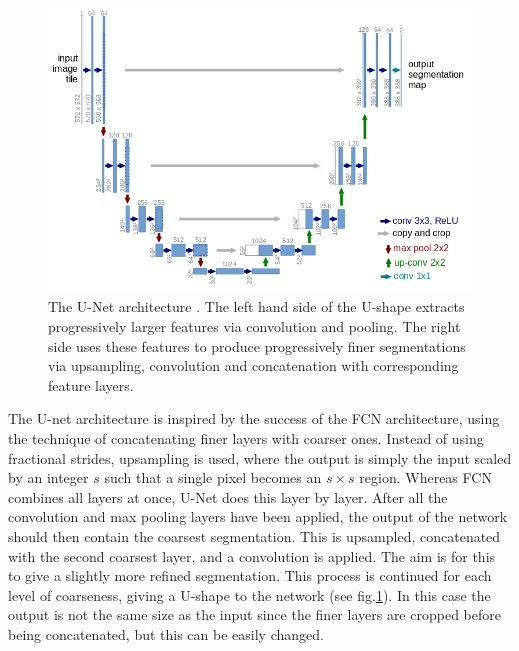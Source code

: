 
\begin{figure}[h!]
\centering
\includegraphics[scale=0.55]{pictures/U-Net}
\caption{The U-Net architecture \cite{uNet}. The left hand side of the U-shape extracts progressively larger features via convolution and pooling. The right side uses these features to produce progressively finer segmentations via upsampling, convolution and concatenation with corresponding feature layers.}
\label{fig:U-Net}
\end{figure}

The U-net architecture is inspired by the success of the FCN architecture, using the technique of concatenating finer layers with coarser ones. Instead of using fractional strides, upsampling is used, where the output is simply the input scaled by an integer $s$ such that a single pixel becomes an $s\times s$ region. Whereas FCN combines all layers at once, U-Net does this layer by layer. After all the convolution and max pooling layers have been applied, the output of the network should then contain the coarsest segmentation. This is upsampled, concatenated with the second coarsest layer, and a convolution is applied. The aim is for this to give a slightly more refined segmentation. This process is continued for each level of coarseness, giving a U-shape to the network (see fig.\ref{fig:U-Net}). In this case the output is not the same size as the input since the finer layers are cropped before being concatenated, but this can be easily changed.